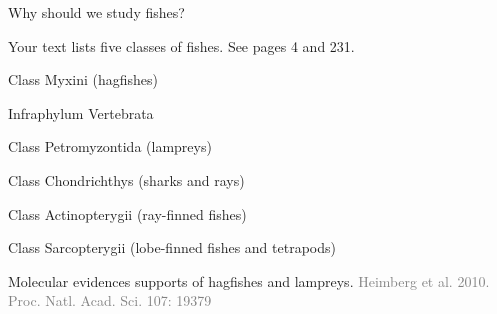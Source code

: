 \documentclass[t]{beamer}
\begin{document}
{
\begin{frame}[t,plain]{Why should we study fishes?}
\end{frame}
}

\begin{frame}[t,plain]{Your text lists five classes of fishes. {\small See pages 4 and 231.}}

	\hspace{5em} Class Myxini (hagfishes)
	
	\hspace{4em} {\small Infraphylum Vertebrata}

	\hspace{5em} Class Petromyzontida (lampreys)

	\hspace{5em} Class Chondrichthys (sharks and rays)

	\hspace{5em} Class Actinopterygii (ray-finned fishes)

	\hspace{5em} Class Sarcopterygii (lobe-finned fishes and tetrapods)
	
	\hangpara{}
	
\end{frame}

{
\begin{frame}[b,plain]{Molecular evidences supports  of hagfishes and lampreys.}
	\hfill\textcolor{gray}{Heimberg et al. 2010. Proc. Natl. Acad. Sci. 107:  19379}
\end{frame}
}
\end{document}
